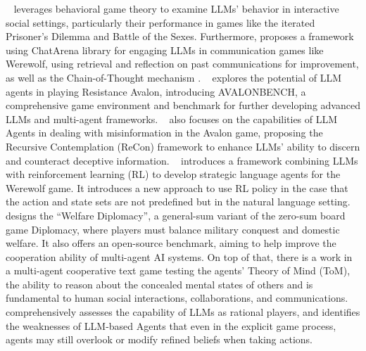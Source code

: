 ~\cite{akata2023playing} leverages behavioral game theory to examine LLMs' behavior in interactive social settings, particularly their performance in games like the iterated Prisoner's Dilemma and Battle of the Sexes. Furthermore, \cite{xu2023exploring} proposes a framework using ChatArena library \cite{ChatArena} for engaging LLMs in communication games like Werewolf, using retrieval and reflection on past communications for improvement, as well as the Chain-of-Thought mechanism \cite{wei2022chain}.
~\cite{light2023text} explores the potential of LLM agents in playing Resistance Avalon, introducing AVALONBENCH, a comprehensive game environment and benchmark for further developing advanced LLMs and multi-agent frameworks. ~\cite{wang2023avalon} also focuses on the capabilities of LLM Agents in dealing with misinformation in the Avalon game, proposing the Recursive Contemplation (ReCon) framework to enhance LLMs' ability to discern and counteract deceptive information. 
~\cite{xu2023language} introduces a framework combining LLMs with reinforcement learning (RL) to develop strategic language agents for the Werewolf game. It introduces a new approach to use RL policy in the case that the action and state sets are not predefined but in the natural language setting. ~\cite{mukobi2023welfare} designs the ``Welfare Diplomacy”, a general-sum variant of the zero-sum board game Diplomacy, where players must balance military conquest and domestic welfare. It also offers an open-source benchmark, aiming to help improve the cooperation ability of multi-agent AI systems. On top of that, there is a work \cite{li2023theory} in a multi-agent cooperative text game testing the agents' Theory of Mind (ToM), the ability to reason about the concealed mental states of others and is fundamental to human social interactions, collaborations, and communications. \cite{fan2023can} comprehensively assesses the capability of LLMs as rational players, and identifies the weaknesses of LLM-based Agents that even in the explicit game process, agents may still overlook or modify refined beliefs when taking actions.


